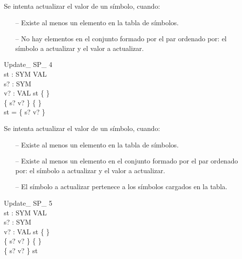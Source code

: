 \begin{tcolorbox}[colback=gray!5!white,colframe=gray!50!black,
  colbacktitle=gray!75!black,title=Update\_ SP\_ 3]
  Se intenta actualizar el valor de un símbolo, cuando:
     \begin{itemize}
        \item[--]{Existe al menos un elemento en la tabla de símbolos.}
        \item[--]{No hay elementos en el conjunto formado por el par ordenado por: el símbolo a actualizar y el valor a actualizar.}
     \end{itemize}
\end{tcolorbox}


\begin{schema}{Update\_ SP\_ 4}\\
 st : SYM \pfun VAL \\
 s? : SYM \\
 v? : VAL 
\where
 st \neq \{ \} \\
 \{ s? \mapsto v? \} \neq \{ \} \\
 \dom st = \dom \{ s? \mapsto v? \}
\end{schema}

\begin{tcolorbox}[colback=gray!5!white,colframe=gray!50!black,
  colbacktitle=gray!75!black,title=Update\_ SP\_ 4]
  Se intenta actualizar el valor de un símbolo, cuando:
     \begin{itemize}
        \item[--]{Existe al menos un elemento en la tabla de símbolos.}
        \item[--]{Existe al menos un elemento en el conjunto formado por el par ordenado por: el símbolo a actualizar y el valor a actualizar.}
        \item[--]{El símbolo a actualizar pertenece a los símbolos cargados en la tabla.}
     \end{itemize}
\end{tcolorbox}

\begin{schema}{Update\_ SP\_ 5}\\
 st : SYM \pfun VAL \\
 s? : SYM \\
 v? : VAL 
\where
 st \neq \{ \} \\
 \{ s? \mapsto v? \} \neq \{ \} \\
 \dom \{ s? \mapsto v? \} \subset \dom st
\end{schema}

